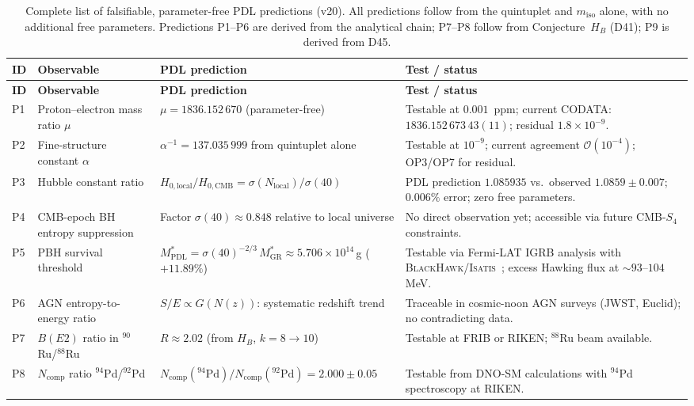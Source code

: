 \documentclass[11pt,a4paper]{article}
\theoremstyle{plain}
\theoremstyle{definition}
\theoremstyle{remark}
\begin{document}
\begin{longtable}{L{0.5cm}L{3.2cm}L{5.2cm}L{4.2cm}}
\caption{Complete list of falsifiable, parameter-free PDL predictions (v20). All predictions follow from the quintuplet and $m_{\mathrm{iso}}$ alone, with no additional free parameters. Predictions P1--P6 are derived from the analytical chain; P7--P8 follow from Conjecture~$H_B$ (D41); P9 is derived from D45.}
\label{tab:predictions}\\
\toprule
\textbf{ID} & \textbf{Observable} & \textbf{PDL prediction} & \textbf{Test / status}\\
\midrule
\endfirsthead
\toprule
\textbf{ID} & \textbf{Observable} & \textbf{PDL prediction} & \textbf{Test / status}\\
\midrule
\endhead
\bottomrule
\endfoot
P1 & Proton--electron mass ratio $\mu$ & $\mu=1836.152\,670$ (parameter-free) & Testable at $0.001$~ppm; current CODATA: $1836.152\,673\,43(11)$; residual $1.8\times10^{-9}$.\\[0.4em]
P2 & Fine-structure constant $\alpha$ & $\alpha^{-1}=137.035\,999$ from quintuplet alone & Testable at $10^{-9}$; current agreement $\mathcal{O}(10^{-4})$; OP3/OP7 for residual.\\[0.4em]
P3 & Hubble constant ratio & $H_{0,\mathrm{local}}/H_{0,\mathrm{CMB}}=\sigma(N_{\mathrm{local}})/\sigma(40)$ & PDL prediction $1.085935$ vs.\ observed $1.0859\pm0.007$; $0.006\%$ error; zero free parameters.\\[0.4em]
P4 & CMB-epoch BH entropy suppression & Factor $\sigma(40)\approx 0.848$ relative to local universe & No direct observation yet; accessible via future CMB-$S_4$ constraints.\\[0.4em]
P5 & PBH survival threshold & $M^*_{\mathrm{PDL}}=\sigma(40)^{-2/3}\,M^*_{\mathrm{GR}}\approx 5.706\times10^{14}$\,g ($+11.89\%$) & Testable via Fermi-LAT IGRB analysis with \textsc{BlackHawk}/\textsc{Isatis}~\cite{D45}; excess Hawking flux at $\sim93$--$104$\,MeV.\\[0.4em]
P6 & AGN entropy-to-energy ratio & $S/E\propto G(N(z))$: systematic redshift trend & Traceable in cosmic-noon AGN surveys (JWST, Euclid); no contradicting data.\\[0.4em]
P7 & $B(E2)$ ratio in $^{90}$Ru/$^{88}$Ru & $R\approx 2.02$ (from $H_B$, $k=8\to10$) & Testable at FRIB or RIKEN; $^{88}$Ru beam available.\\[0.4em]
P8 & $N_{\mathrm{comp}}$ ratio $^{94}$Pd/$^{92}$Pd & $N_{\mathrm{comp}}(^{94}\mathrm{Pd})/N_{\mathrm{comp}}(^{92}\mathrm{Pd})=2.000\pm0.05$ & Testable from DNO-SM calculations with $^{94}$Pd spectroscopy at RIKEN.\\[0.4em]

\end{longtable}
\end{document}
